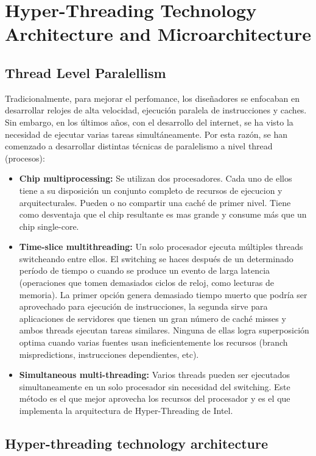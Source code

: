 \newpage
\section{Hyper-Threading Technology Architecture and Microarchitecture}
\subsection{Thread Level Paralellism}
Tradicionalmente, para mejorar el perfomance, los diseñadores se enfocaban en desarrollar relojes de alta velocidad, ejecución paralela de instrucciones y caches. Sin embargo, en los últimos años, con el desarrollo del internet, se ha visto la necesidad de ejecutar varias tareas simultáneamente. Por esta razón, se han comenzado a desarrollar distintas técnicas de paralelismo a nivel thread (procesos):

\begin{itemize}
	\item \textbf{Chip multiprocessing:}
	 Se utilizan dos procesadores. Cada uno de ellos tiene a su disposición un conjunto completo de recursos de ejecucion y arquitecturales. Pueden o no compartir una caché de primer nivel. Tiene como desventaja que el chip resultante es mas grande y consume más que un chip single-core.
	\item\textbf{Time-slice multithreading:} Un solo procesador ejecuta múltiples threads switcheando entre ellos. El switching se haces después de un determinado período de tiempo o cuando se produce un evento de larga latencia (operaciones que tomen demasiados ciclos de reloj, como lecturas de memoria). La primer opción genera demasiado tiempo muerto que podría ser aprovechado para ejecución de instrucciones, la segunda sirve para aplicaciones de servidores que tienen un gran número de caché misses y ambos threads ejecutan tareas similares. Ninguna de ellas logra superposición optima cuando varias fuentes usan ineficientemente los recursos (branch mispredictions, instrucciones dependientes, etc).
	\item \textbf{Simultaneous multi-threading:} Varios threads pueden ser ejecutados simultaneamente en un solo procesador sin necesidad del switching. Este método es el que mejor aprovecha los recursos del procesador y es el que implementa la arquitectura de Hyper-Threading de Intel.
\end{itemize}

\subsection{Hyper-threading technology architecture}

